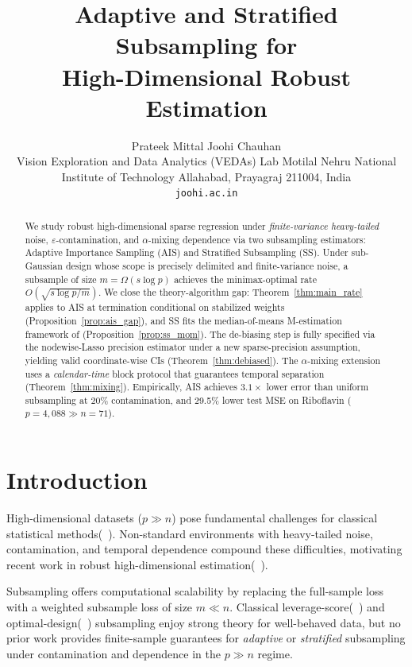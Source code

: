 \documentclass[10pt]{article}
\title{\textbf{Adaptive and Stratified Subsampling for\\
High-Dimensional Robust Estimation}}
\author{Prateek Mittal \quad Joohi Chauhan\\[2pt]
{\small Vision Exploration and Data Analytics (VEDAs) Lab}
{\small Motilal Nehru National Institute of Technology Allahabad, Prayagraj 211004, India}\\
{\small \texttt{joohi\@mnnit.ac.in}}}
\date{}
\begin{document}
\maketitle

\begin{abstract}
We study robust high-dimensional sparse regression under
\emph{finite-variance heavy-tailed} noise, $\varepsilon$-contamination, and
$\alpha$-mixing dependence via two subsampling estimators: Adaptive Importance
Sampling (AIS) and Stratified Subsampling (SS).
Under sub-Gaussian design whose scope is precisely delimited and
finite-variance noise, a subsample of size $m=\Omega(s\log p)$ achieves the
minimax-optimal rate $O(\sqrt{s\log p/m})$.
We close the theory-algorithm gap: Theorem~\ref{thm:main_rate} applies to AIS
at termination conditional on stabilized weights (Proposition~\ref{prop:ais_gap}),
and SS fits the median-of-means M-estimation framework of
\citet{lecue2020robust} (Proposition~\ref{prop:ss_mom}).
The de-biasing step is fully specified via the nodewise-Lasso precision estimator
under a new sparse-precision assumption, yielding valid coordinate-wise CIs
(Theorem~\ref{thm:debiased}).
The $\alpha$-mixing extension uses a \emph{calendar-time} block protocol that
guarantees temporal separation (Theorem~\ref{thm:mixing}).
Empirically, AIS achieves $3.1\times$ lower error than uniform subsampling at
20\% contamination, and 29.5\% lower test MSE on Riboflavin
($p{=}4{,}088\gg n{=}71$).
\end{abstract}

\section{Introduction}

High-dimensional datasets ($p\gg n$) pose fundamental challenges for classical
statistical methods(~\cite{fan2014challenges}). Non-standard environments with heavy-tailed noise, contamination, and temporal dependence compound these difficulties, motivating recent work in robust high-dimensional
estimation(~\cite{sun2020adaptive,pensia2025robust,lecue2020robust,fan2024right,
smucler2017robust,kurnaz2023robust}).

Subsampling offers computational scalability by replacing the full-sample loss
with a weighted subsample loss of size $m\ll n$. Classical
leverage-score(~\cite{ma2015statistical}) and optimal-design(~\cite{li2020modern})
subsampling enjoy strong theory for well-behaved data, but no prior work provides
finite-sample guarantees for \emph{adaptive} or \emph{stratified} subsampling
under contamination and dependence in the $p\gg n$ regime.
\end{document}
